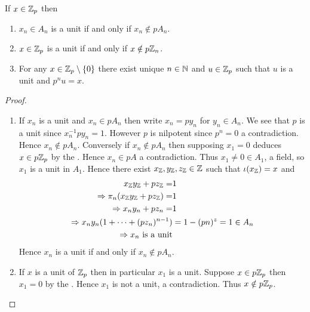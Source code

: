 \begin{prop}
    If $x \in \mathbb{Z}_p$ then
    \begin{enumerate}
        \item $x_n \in A_n$ is a unit if and only if $x_n \notin p A_n$.
        \item $x \in \mathbb{Z}_p$ is a unit if and only if $x \notin p \mathbb{Z}_n$.
        \item For any $ x \in \mathbb{Z}_p \setminus \left\{0\right\}$ there exist 
            unique $n \in \mathbb{N}$ and $u \in \mathbb{Z}_p$ such that
            $u$ is a unit and $p^n u = x$.
    \end{enumerate}
\end{prop}
\begin{proof}~
    \begin{enumerate}
        \item If $x_n$ is a unit and $x_n \in p A_n$ then
            write $x_n = p y_n $ for $y_n \in A_n$.
            We see that $p$ is a unit since $x_n ^{-1} p y_n = 1$.
            However $p$ is nilpotent since $p^n = 0$ a contradiction.
            Hence $x_n \notin p A_n$.
            Conversely if $x_n \notin p A_n$ then
            supposing $x_1 = 0$ deduces $x \in p \mathbb{Z}_p$ by 
            the .
            Hence $x_n \in p A$ a contradiction.
            Thus $x_1 \ne 0 \in A_1$, a field,
            so $x_1$ is a unit in $A_1$.
            Hence there exist $x_{\mathbb{Z}},y_{\mathbb{Z}},z_{\mathbb{Z}} \in \mathbb{Z}$
            such that $\iota(x_{\mathbb{Z}}) = x$ and 
            \begin{align*}
                x_{\mathbb{Z}} y_{\mathbb{Z}} + p z_{\mathbb{Z}} =& 1 \\
                \Rightarrow \pi_n(x_{\mathbb{Z}} y_{\mathbb{Z}} + p z_{\mathbb{Z}}) =& 1\\
                \Rightarrow x_n y_n + p z_n =& 1\\
                \Rightarrow x_n y_n (1 + \dots + (p z_n)^{n-1}) &= 
                1 - (pn)^z = 1 \in A_n\\
                \Rightarrow x_n \text{ is a unit}
            \end{align*}
            Hence $x_n$ is a unit if and only if $x_n \notin p A_n$.
        \item If $x$ is a unit of $\mathbb{Z}_p$
            then in particular $x_1$ is a unit.
            Suppose $x \in p \mathbb{Z}_p$ then $x_1 = 0$ by the 
            .
            Hence $x_1$ is not a unit, a contradiction.
            Thus $x \notin p \mathbb{Z}_p$.
            

\end{enumerate}
\end{proof}
